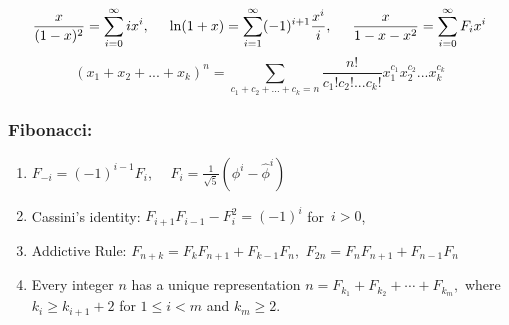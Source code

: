 \documentclass[12pt]{extarticle}
\begin{document}
\begin{multicols*}{2}
\begin{enumerate}
			\end{enumerate}
			$$ {x \over (1 - x)^2} = \sum_{i=0}^\infty i x^i, \hspace{5mm}
			\ln (1 + x) = \sum_{i=1}^\infty (-1)^{i+1} {x^i \over i}, \hspace{5mm} {x \over 1 - x - x^2} = \sum_{i=0}^\infty F_i x^i$$
			$$(x_1 + x_2 + ... + x_k)^n = \sum_{c_1 + c_2 + ... + c_k = n}
			\frac{n!}{c_1! c_2! ... c_k!} x_1^{c_1} x_2^{c_2} ... x_k^{c_k}$$
			
		
		\subsubsection*{Fibonacci:}
		\begin{enumerate}
		\item $F_{-i} = (-1)^{i-1} F_i$,  $ \quad F_i = \frac{1}{\sqrt{5}} \left(\phi^i - \hat{\phi}^i\right)$
		\item Cassini's identity: $F_{i+1} F_{i-1} - F^2_i = (-1)^i$ \quad \hbox{for $i > 0$,}
		\item Addictive Rule:
		\hspace{2mm}
		$F_{n+k} = F_k F_{n+1} + F_{k-1} F_n,$ \hspace{2mm}
		$F_{2n} = F_n F_{n+1} + F_{n-1} F_n$
		
		\item Every integer $n$ has a unique representation
		$ n = F_{k_1} + F_{k_2} + \cdots + F_{k_m},$
		where $k_i \geq k_{i+1} + 2$ for $1 \leq i < m$ and $k_m \geq 2$.
		\end{enumerate}
		
		\end{multicols*}
\end{document}
